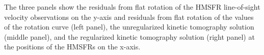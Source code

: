 \label{fig:hmsfr_comparison}
The three panels show the residuals from flat rotation of the \citet{2009ApJ...700..137R} HMSFR line-of-sight velocity observations on the y-axis and residuals from flat rotation of the values of the \citet{Clemens:1985dp} rotation curve (left panel), the unregularized kinetic tomography solution (middle panel), and the regularized kinetic tomography solution (right panel) at the positions of the HMSFRs on the x-axis.
